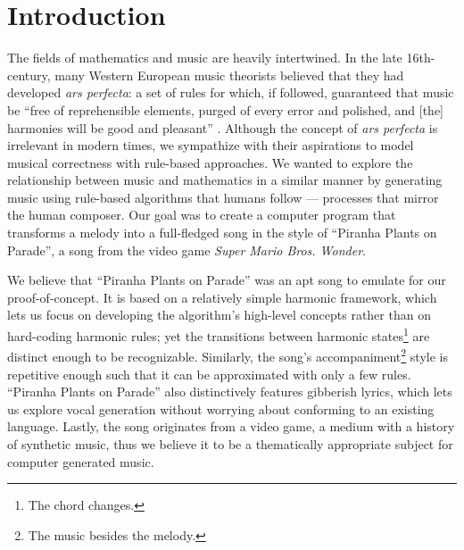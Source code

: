 \section{Introduction}

The fields of mathematics and music are heavily intertwined. In the late 16th-century, many Western European music theorists believed that they had developed \emph{ars perfecta}: a set of rules for which, if followed, guaranteed that music be ``free of reprehensible elements, purged of every error and polished, and [the] harmonies will be good and pleasant'' \autocite{Richard:2005}. Although the concept of \emph{ars perfecta} is irrelevant in modern times, we sympathize with their aspirations to model musical correctness with rule-based approaches. We wanted to explore the relationship between music and mathematics in a similar manner by generating music using rule-based algorithms that humans follow --- processes that mirror the human composer. Our goal was to create a computer program that transforms a melody into a full-fledged song in the style of ``Piranha Plants on Parade'', a song from the video game \emph{Super Mario Bros. Wonder}.

We believe that ``Piranha Plants on Parade'' was an apt song to emulate for our proof-of-concept. It is based on a relatively simple harmonic framework, which lets us focus on developing the algorithm's high-level concepts rather than on hard-coding harmonic rules; yet the transitions between harmonic states\footnote{The chord changes.} are distinct enough to be recognizable. Similarly, the song's accompaniment\footnote{The music besides the melody.} style is repetitive enough such that it can be approximated with only a few rules. ``Piranha Plants on Parade'' also distinctively features gibberish lyrics, which lets us explore vocal generation without worrying about conforming to an existing language. Lastly, the song originates from a video game, a medium with a history of synthetic music, thus we believe it to be a thematically appropriate subject for computer generated music.
